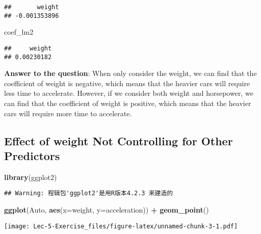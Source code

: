 \documentclass[
]{article}
\newenvironment{Shaded}{\begin{snugshade}}{\end{snugshade}}
\newcommand{\AttributeTok}[1]{\textcolor[rgb]{0.13,0.29,0.53}{#1}}
\newcommand{\FunctionTok}[1]{\textcolor[rgb]{0.13,0.29,0.53}{\textbf{#1}}}
\newcommand{\NormalTok}[1]{#1}
\newcommand{\SpecialCharTok}[1]{\textcolor[rgb]{0.81,0.36,0.00}{\textbf{#1}}}
\begin{document}
\begin{verbatim}
##       weight 
## -0.001353896
\end{verbatim}

\begin{Shaded}
\begin{Highlighting}[]
\NormalTok{coef\_lm2}
\end{Highlighting}
\end{Shaded}

\begin{verbatim}
##     weight 
## 0.00230182
\end{verbatim}

\textbf{Answer to the question}: When only consider the weight, we can
find that the coefficient of weight is negative, which means that the
heavier cars will require less time to accelerate. However, if we
consider both weight and horsepower, we can find that the coefficient of
weight is positive, which means that the heavier cars will require more
time to accelerate.

\hypertarget{effect-of-weight-controlling-for-other-predictors}{%
\subsection{\texorpdfstring{Effect of weight \textbf{Not} Controlling
for Other
Predictors}{Effect of weight  Controlling for Other Predictors}}\label{effect-of-weight-controlling-for-other-predictors}}

\begin{Shaded}
\begin{Highlighting}[]
\FunctionTok{library}\NormalTok{(ggplot2)}
\end{Highlighting}
\end{Shaded}

\begin{verbatim}
## Warning: 程辑包'ggplot2'是用R版本4.2.3 来建造的
\end{verbatim}

\begin{Shaded}
\begin{Highlighting}[]
\FunctionTok{ggplot}\NormalTok{(Auto, }\FunctionTok{aes}\NormalTok{(}\AttributeTok{x=}\NormalTok{weight, }\AttributeTok{y=}\NormalTok{acceleration)) }\SpecialCharTok{+} \FunctionTok{geom\_point}\NormalTok{()}
\end{Highlighting}
\end{Shaded}

\texttt{[image: Lec-5-Exercise\_files/figure-latex/unnamed-chunk-3-1.pdf]}
\end{document}
